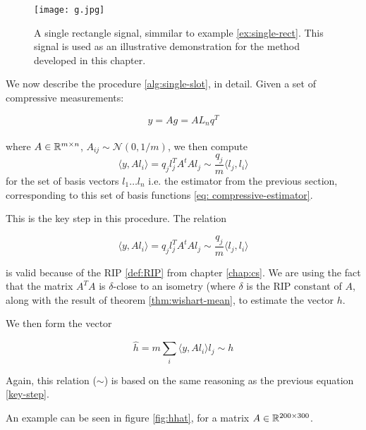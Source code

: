 \begin{figure}[h]
\centering
\texttt{[image: g.jpg]}
\caption{A single rectangle signal, simmilar to example \ref{ex:single-rect}. This signal is used as an illustrative demonstration for the method developed in this chapter.}
\label{fig:rectangle}
\end{figure}

We now describe the procedure \ref{alg:single-slot}, in detail. Given a set of compressive measurements: 

\begin{equation}
y = Ag = AL_n q^T
\end{equation}
\\
where \(A \in {\mathbb{R}}^{m \times n} \), \(A_{ij} \sim \mathcal{N}\left(0,1/m\right)\), we then compute 
\begin{equation}
\langle y, Al_i\rangle = q_j  l_j^TA^tAl_j \sim \frac{q_j}{m} \langle l_j, l_i \rangle
\label{key-step}
\end{equation}
for the set of basis vectors \(l_1 \ldots l_n\) i.e. the estimator from the previous section, corresponding to this set of basis functions \eqref{eq: compressive-estimator}. 

\begin{remark}
This is the key step in this procedure. The relation 

\begin{equation}
\langle y, Al_i\rangle = q_j  l_j^TA^tAl_j \sim \frac{q_j}{m} \langle l_j, l_i \rangle
\end{equation}

is valid because of the RIP \eqref{def:RIP} from chapter \ref{chap:cs}. We are using the fact that the matrix \(A^TA\) is \(\delta\)-close to an isometry (where \(\delta\) is the RIP constant of \(A\), along with the result of theorem \eqref{thm:wishart-mean}, to estimate the vector \(h\).

\end{remark}
We then form the vector 

\begin{equation}
\hat{h} = m \sum_i \langle y, Al_i\rangle l_j \sim h
\label{ss-estimator}
\end{equation}

Again, this relation (\(\sim\)) is based on the same reasoning as the previous equation \eqref{key-step}.

An example can be seen in figure \ref{fig:hhat}, for a matrix \(A \in {\mathbb{R}}^{200 \times 300}\).


